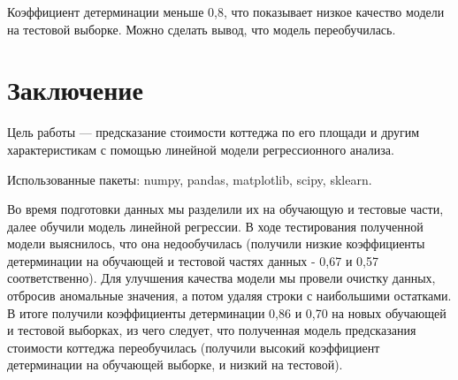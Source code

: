 \documentclass[11pt]{article}
\begin{document}
    Коэффициент детерминации меньше 0,8, что показывает низкое качество
модели на тестовой выборке. Можно сделать вывод, что модель
переобучилась.

    \hypertarget{ux437ux430ux43aux43bux44eux447ux435ux43dux438ux435}{%
\section{Заключение}\label{ux437ux430ux43aux43bux44eux447ux435ux43dux438ux435}}

    Цель работы --- предсказание стоимости коттеджа по его площади и другим
характеристикам с помощью линейной модели регрессионного анализа.

    Использованные пакеты: numpy, pandas, matplotlib, scipy, sklearn.

    Во время подготовки данных мы разделили их на обучающую и тестовые
части, далее обучили модель линейной регрессии. В ходе тестирования
полученной модели выяснилось, что она недообучилась (получили низкие
коэффициенты детерминации на обучающей и тестовой частях данных - 0,67 и
0,57 соответственно). Для улучшения качества модели мы провели очистку
данных, отбросив аномальные значения, а потом удаляя строки с
наибольшими остатками. В итоге получили коэффициенты детерминации 0,86 и
0,70 на новых обучающей и тестовой выборках, из чего следует, что
полученная модель предсказания стоимости коттеджа переобучилась
(получили высокий коэффициент детерминации на обучающей выборке, и
низкий на тестовой).


    
    
    
\end{document}

